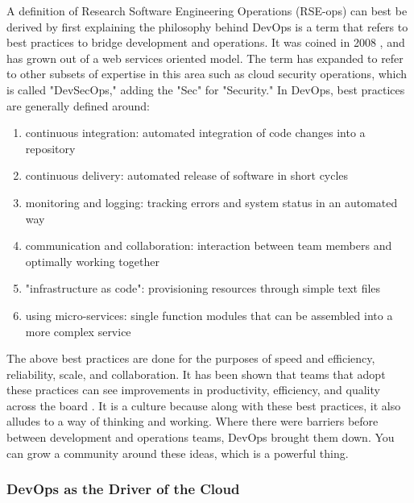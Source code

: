 A definition of Research Software Engineering Operations (RSE-ops) can best be derived by first explaining the philosophy behind DevOps \cite{aws} is a term that refers to best practices to bridge development and operations. It was coined in 2008 \cite{devops-paper}, and has grown out of a web services oriented model. The term has expanded to refer to other subsets of expertise in this area such as cloud security operations, which is called "DevSecOps," adding the "Sec" for "Security." In DevOps, best practices are generally defined around:

\begin{enumerate}
\item continuous integration: automated integration of code changes into a repository
\item continuous delivery: automated release of software in short cycles
\item monitoring and logging: tracking errors and system status in an automated way
\item communication and collaboration: interaction between team members and optimally working together
\item "infrastructure as code": provisioning resources through simple text files
\item using micro-services: single function modules that can be assembled into a more complex service
\end{enumerate}


The above best practices are done for the purposes of speed and efficiency, reliability, scale, and collaboration. It has been shown that teams that adopt these practices can see improvements in productivity, efficiency, and quality across the board \cite{devops-changed-things}. It is a culture because along with these best practices, it also alludes to a way of thinking and working. Where there were barriers before between development and operations teams, DevOps brought them down. You can grow a community around these ideas, which is a powerful thing. 

\subsubsection{DevOps as the Driver of the Cloud}

